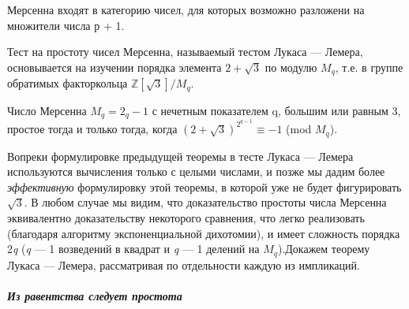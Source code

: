 \documentclass{mai_book}
\begin{document}
	
	\noindent
	Мерсенна входят в категорию чисел, для которых возможно разложе­ни на множители числа р + 1.
	
	Тест на простоту чисел Мерсенна, называемый тестом Лукаса —	Лемера, основывается на изучении порядка элемента $2+\sqrt{3}$ по модулю $M_q$, т.е. в группе обратимых факторкольца $\mathbb Z[\sqrt{3}]/M_{q}$.
	\noindent
	
	\begin{thm}
	\noindent
	
	Число Мерсенна $M_q = 2_{q}-1$ с нечетным показателем q, большим или равным 3, простое тогда и только тогда, когда $(2+\sqrt{3})^{2^{q-1}} \equiv -1$ (mod $M_q$).
	\end{thm}
	Вопреки формулировке предыдущей теоремы в тесте Лукаса — Лемера используются вычисления только с целыми числами, и позже мы	дадим более {\it эффективную} формулировку этой теоремы, в которой уже	не будет фигурировать $\sqrt{3}$. В любом случае мы видим, что доказательство простоты числа Мерсенна эквивалентно доказательству некоторо­го сравнения, что легко реализовать (благодаря алгоритму экспонен­циальной дихотомии), и имеет сложность порядка 2{\it q} ({\it q} — 1 возведений	в квадрат и {\it q} — 1 делений на $M_q$).Докажем теорему Лукаса — Лемера, рассматривая по отдельности каждую из импликаций.
	\noindent 
	
	\paragraph{{\it Из равентства следует простота}}
	\noindent
	
\end{document}
